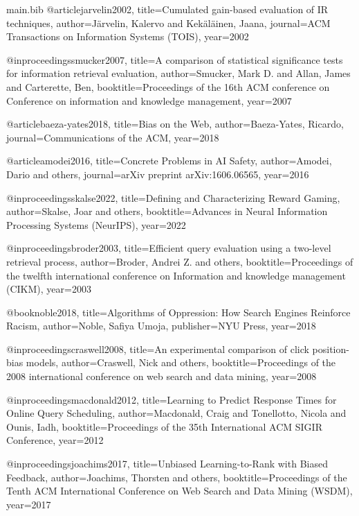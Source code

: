 \begin{filecontents*}{main.bib}
@article{jarvelin2002,
  title={Cumulated gain-based evaluation of IR techniques},
  author={J{\"a}rvelin, Kalervo and Kek{\"a}l{\"a}inen, Jaana},
  journal={ACM Transactions on Information Systems (TOIS)},
  year={2002}
}

@inproceedings{smucker2007,
  title={A comparison of statistical significance tests for information retrieval evaluation},
  author={Smucker, Mark D. and Allan, James and Carterette, Ben},
  booktitle={Proceedings of the 16th ACM conference on Conference on information and knowledge management},
  year={2007}
}

@article{baeza-yates2018,
  title={Bias on the Web},
  author={Baeza-Yates, Ricardo},
  journal={Communications of the ACM},
  year={2018}
}

@article{amodei2016,
  title={Concrete Problems in AI Safety},
  author={Amodei, Dario and others},
  journal={arXiv preprint arXiv:1606.06565},
  year={2016}
}

@inproceedings{skalse2022,
  title={Defining and Characterizing Reward Gaming},
  author={Skalse, Joar and others},
  booktitle={Advances in Neural Information Processing Systems (NeurIPS)},
  year={2022}
}

@inproceedings{broder2003,
  title={Efficient query evaluation using a two-level retrieval process},
  author={Broder, Andrei Z. and others},
  booktitle={Proceedings of the twelfth international conference on Information and knowledge management (CIKM)},
  year={2003}
}

@book{noble2018,
  title={Algorithms of Oppression: How Search Engines Reinforce Racism},
  author={Noble, Safiya Umoja},
  publisher={NYU Press},
  year={2018}
}

@inproceedings{craswell2008,
  title={An experimental comparison of click position-bias models},
  author={Craswell, Nick and others},
  booktitle={Proceedings of the 2008 international conference on web search and data mining},
  year={2008}
}

@inproceedings{macdonald2012,
  title={Learning to Predict Response Times for Online Query Scheduling},
  author={Macdonald, Craig and Tonellotto, Nicola and Ounis, Iadh},
  booktitle={Proceedings of the 35th International ACM SIGIR Conference},
  year={2012}
}

@inproceedings{joachims2017,
  title={Unbiased Learning-to-Rank with Biased Feedback},
  author={Joachims, Thorsten and others},
  booktitle={Proceedings of the Tenth ACM International Conference on Web Search and Data Mining (WSDM)},
  year={2017}
}
\end{filecontents*}

